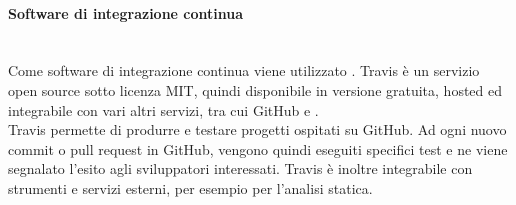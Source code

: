 \paragraph{Software di integrazione continua}\mbox{}\\
Come software di integrazione continua viene utilizzato \textbf{}.
Travis è un servizio open source sotto licenza MIT, quindi disponibile in versione gratuita, hosted ed integrabile con vari altri servizi, tra cui GitHub e .\\ Travis permette di produrre e testare progetti ospitati su GitHub. Ad ogni nuovo commit o pull request in GitHub, vengono quindi eseguiti specifici test e ne viene segnalato l'esito agli sviluppatori interessati. Travis è inoltre integrabile con strumenti e servizi esterni, per esempio per l'analisi statica.

